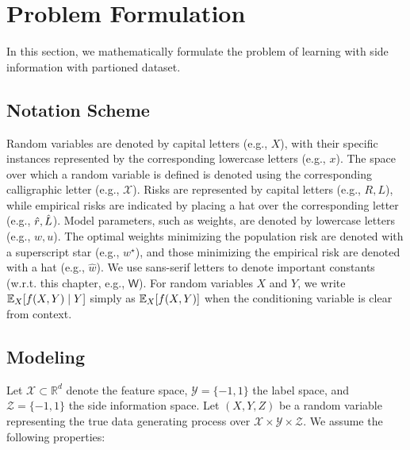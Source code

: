 


\section{Problem Formulation}
In this section, we mathematically formulate the problem of learning with side information with partioned dataset.

\subsection{Notation Scheme}

Random variables are denoted by capital letters (e.g., $X$), with their specific instances represented by the corresponding lowercase letters (e.g., $x$). The space over which a random variable is defined is denoted using the corresponding calligraphic letter (e.g., $\mathcal{X}$). Risks are represented by capital  letters (e.g., $R,L$), while empirical risks are indicated by placing a hat over the corresponding letter (e.g., $\hat{r}, \hat{L}$). Model parameters, such as weights, are denoted by lowercase  letters (e.g., $w,u$). The optimal weights minimizing the population risk are denoted with a superscript star (e.g., $w^\star$), and those minimizing the empirical risk are denoted with a hat (e.g., $\hat{w}$). We use sans-serif letters to denote important constants (w.r.t. this chapter, e.g., $\mathsf{W}$). For random variables $X$ and $Y$, we write $\mathbb{E}_{X}[f(X,Y)\mid Y]$ simply as $\mathbb{E}_{X}[f(X,Y)]$ when the conditioning variable is clear from context.


\subsection{Modeling}
Let $\mathcal{X} \subset \mathbb{R}^d$ denote the feature space, $\mathcal{Y} = \{-1, 1\}$ the label space, and $\mathcal{Z} = \{-1, 1\}$ the side information space. Let $(X, Y, Z)$ be a random variable representing the true data generating process over $\mathcal{X} \times \mathcal{Y} \times \mathcal{Z}$. We assume the following properties:

